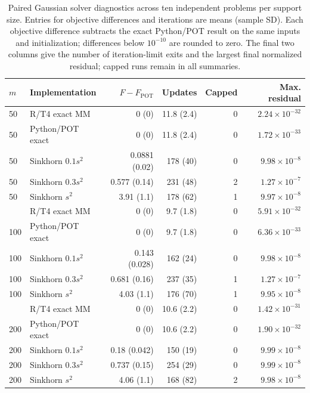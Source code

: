\begin{table}[htbp]
\centering
\small
\caption{Paired Gaussian solver diagnostics across ten independent problems per support size. Entries for objective differences and iterations are means (sample SD). Each objective difference subtracts the exact Python/POT result on the same inputs and initialization; differences below $10^{-10}$ are rounded to zero. The final two columns give the number of iteration-limit exits and the largest final normalized residual; capped runs remain in all summaries.}
\label{tab:paired-gaussian-diagnostics}
\begin{tabular}{llrrrr}
\toprule
$m$ & Implementation & $F-F_{\mathrm{POT}}$ & Updates & Capped & Max. residual \\
\midrule
50 & R/T4 exact MM & 0 (0) & 11.8 (2.4) & 0 & $2.24\times 10^{-32}$ \\
50 & Python/POT exact & 0 (0) & 11.8 (2.4) & 0 & $1.72\times 10^{-33}$ \\
50 & Sinkhorn $0.1s^2$ & 0.0881 (0.02) & 178 (40) & 0 & $9.98\times 10^{-8}$ \\
50 & Sinkhorn $0.3s^2$ & 0.577 (0.14) & 231 (48) & 2 & $1.27\times 10^{-7}$ \\
50 & Sinkhorn $s^2$ & 3.91 (1.1) & 178 (62) & 1 & $9.97\times 10^{-8}$ \\
\addlinespace
100 & R/T4 exact MM & 0 (0) & 9.7 (1.8) & 0 & $5.91\times 10^{-32}$ \\
100 & Python/POT exact & 0 (0) & 9.7 (1.8) & 0 & $6.36\times 10^{-33}$ \\
100 & Sinkhorn $0.1s^2$ & 0.143 (0.028) & 162 (24) & 0 & $9.98\times 10^{-8}$ \\
100 & Sinkhorn $0.3s^2$ & 0.681 (0.16) & 237 (35) & 1 & $1.27\times 10^{-7}$ \\
100 & Sinkhorn $s^2$ & 4.03 (1.1) & 176 (70) & 1 & $9.95\times 10^{-8}$ \\
\addlinespace
200 & R/T4 exact MM & 0 (0) & 10.6 (2.2) & 0 & $1.42\times 10^{-31}$ \\
200 & Python/POT exact & 0 (0) & 10.6 (2.2) & 0 & $1.90\times 10^{-32}$ \\
200 & Sinkhorn $0.1s^2$ & 0.18 (0.042) & 150 (19) & 0 & $9.99\times 10^{-8}$ \\
200 & Sinkhorn $0.3s^2$ & 0.737 (0.15) & 254 (29) & 0 & $9.99\times 10^{-8}$ \\
200 & Sinkhorn $s^2$ & 4.06 (1.1) & 168 (82) & 2 & $9.98\times 10^{-8}$ \\
\bottomrule
\end{tabular}
\end{table}
